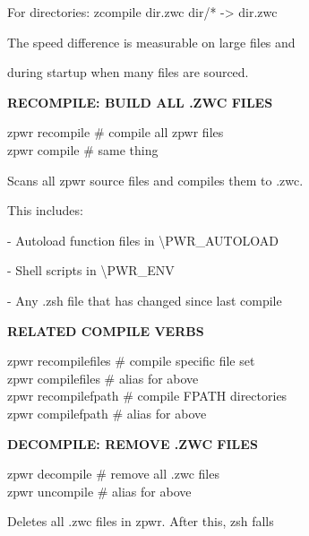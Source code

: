 \documentclass[11pt,a4paper,twoside]{book}
\begin{document}
For directories:      zcompile dir.zwc dir/* -> dir.zwc

The speed difference is measurable on large files and

during startup when many files are sourced.


\vspace{12pt}
{\bfseries\color{neonyellow} RECOMPILE: BUILD ALL .ZWC FILES}\vspace{4pt}

\begin{codebox}
zpwr recompile                      \# compile all zpwr files\\
zpwr compile                        \# same thing\\
\end{codebox}

Scans all zpwr source files and compiles them to .zwc.

This includes:

- Autoload function files in \textbackslash{}PWR\_AUTOLOAD

- Shell scripts in \textbackslash{}PWR\_ENV

- Any .zsh file that has changed since last compile


\vspace{12pt}
{\bfseries\color{neonyellow} RELATED COMPILE VERBS}\vspace{4pt}

\begin{codebox}
zpwr recompilefiles                 \# compile specific file set\\
zpwr compilefiles                   \# alias for above\\
zpwr recompilefpath                 \# compile FPATH directories\\
zpwr compilefpath                   \# alias for above\\
\end{codebox}


\vspace{12pt}
{\bfseries\color{neonyellow} DECOMPILE: REMOVE .ZWC FILES}\vspace{4pt}

\begin{codebox}
zpwr decompile                      \# remove all .zwc files\\
zpwr uncompile                      \# alias for above\\
\end{codebox}

Deletes all .zwc files in zpwr. After this, zsh falls
\end{document}
